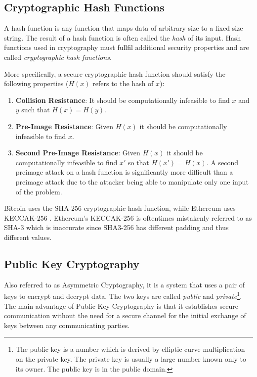\subsection{Cryptographic Hash Functions}
A hash function is any function that maps data of arbitrary size to a fixed size string. The result of a hash function is often called the \textit{hash} of its input. Hash functions used in cryptography must fullfil additional security properties and are called \textit{cryptographic hash functions}.

More specifically, a secure cryptographic hash function should satisfy the following properties \cite{Rogaway04cryptographichash-function} (\(H(x)\) refers to the hash of $x$):
\begin{enumerate}
   \item \textbf{Collision Resistance}: It should be computationally infeasible to find $x$ and $y$ such that \(H(x) = H(y)\). 
   \item \textbf{Pre-Image Resistance}: Given \(H(x)\) it should be computationally infeasible to find \(x\).
   \item \textbf{Second Pre-Image Resistance}: Given \(H(x)\) it should be computationally infeasible to find \(x'\) so that \(H(x') = H(x)\). A second preimage attack on a hash function is significantly more difficult than a preimage attack due to the attacker being able to manipulate only one input of the problem. 
\end{enumerate}

Bitcoin uses the SHA-256 cryptographic hash function, while Ethereum uses KECCAK-256 \cite{btchash, ethash}. Ethereum's KECCAK-256 is oftentimes mistakenly referred to as SHA-3 which is inaccurate since SHA3-256 has different padding and thus different values\cite{sha3}.

\subsection{Public Key Cryptography}
Also referred to as Asymmetric Cryptography, it is a system that uses a pair of keys to encrypt and decrypt data. The two keys are called \textit{public} and \textit{private}\footnote{The public key is a number which is derived by elliptic curve multiplication on the private key. The private key is usually a large number known only to its owner. The public key is in the public domain.}. The main advantage of Public Key Cryptography is that it establishes secure communication without the need for a secure channel for the initial exchange of keys between any communicating parties.

